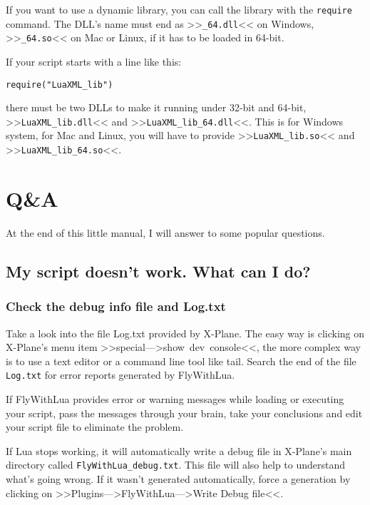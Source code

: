 \documentclass[11pt,parskip=half,a4paper]{scrartcl}
\begin{document}
If you want to use a dynamic library, you can call the library with the \verb|require| command. The DLL's name must end as >>\verb|_64.dll|<< on Windows, >>\verb|_64.so|<< on Mac or Linux, if it has to be loaded in 64-bit.

If your script starts with a line like this:

\begin{lstlisting}[firstnumber=1]
require("LuaXML_lib")
\end{lstlisting}

there must be two DLLs to make it running under 32-bit and 64-bit, >>\verb|LuaXML_lib.dll|<< and >>\verb|LuaXML_lib_64.dll|<<. This is for Windows system, for Mac and Linux, you will have to provide >>\verb|LuaXML_lib.so|<< and >>\verb|LuaXML_lib_64.so|<<.

\newpage
\section{Q\&A}

At the end of this little manual, I will answer to some popular questions.

\subsection{My script doesn't work. What can I do?}

\subsubsection{Check the debug info file and Log.txt}

Take a look into the file Log.txt provided by X-Plane. The easy way is clicking on X-Plane's menu item >>special--->show~dev~console<<, the more complex way is to use a text editor or a command line tool like tail. Search the end of the file \verb|Log.txt| for error reports generated by FlyWithLua.

If FlyWithLua provides error or warning messages while loading or executing your script, pass the messages through your brain, take your conclusions and edit your script file to eliminate the problem.

If Lua stops working, it will automatically write a debug file in X-Plane's main directory called \verb|FlyWithLua_debug.txt|. This file will also help to understand what's going wrong. If it wasn't generated automatically, force a generation by clicking on >>Plugins--->FlyWithLua--->Write Debug file<<.
\end{document}
